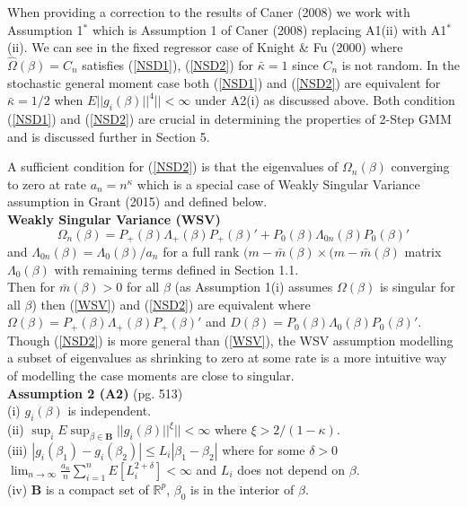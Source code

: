 \documentclass[11pt, fleqn]{article}
\begin{document}
When providing a correction to the results of Caner (2008) we work with Assumption 1$^*$ which is Assumption 1 of Caner (2008) replacing A1(ii) with  A1$^*$(ii). We can see in the fixed regressor case  of Knight \& Fu (2000)  where  $\hat{\Omega}(\beta)=C_n$ satisfies (\ref{NSD1}), (\ref{NSD2}) for $\bar{\kappa}=1$ since $C_n$ is not random. In the stochastic general moment case both (\ref{NSD1})  and (\ref{NSD2}) are equivalent for $\bar{\kappa}=1/2$ when $E|\!|g_i(\beta)|\!|^4|\!|<\infty$ under A2(i) as discussed above. Both condition (\ref{NSD1}) and (\ref{NSD2}) are crucial in determining the properties of 2-Step GMM and is discussed further in Section 5.


A sufficient condition for (\ref{NSD2}) is that the eigenvalues of $\Omega_n(\beta)$ converging to zero at rate $a_n=n^{\kappa}$ which is a special case of  Weakly Singular Variance assumption in Grant (2015) and defined below.\\

 \textbf{Weakly Singular Variance (WSV)}\begin{equation}\label{WSV} \Omega_n(\beta)=P_+(\beta)\Lambda_+(\beta)P_+(\beta)'+P_0(\beta)\Lambda_{0n}(\beta)P_0(\beta)'\end{equation}
   and $\Lambda_{0n}(\beta)=\Lambda_0(\beta)/a_n$   for a full rank  $(m-\bar{m}(\beta)\times (m-\bar{m}(\beta)$ matrix $\Lambda_0(\beta)$
with remaining terms defined in Section 1.1.\\
Then for $\bar{m}(\beta)>0$ for all $\beta$ (as Assumption 1(i) assumes $\Omega(\beta)$ is singular for all $\beta$) then  (\ref{WSV}) and (\ref{NSD2}) are equivalent where $\Omega(\beta)=P_+(\beta)\Lambda_+(\beta)P_+(\beta)'$ and $D(\beta)=P_0(\beta)\Lambda_{0}(\beta)P_0(\beta)'$. Though (\ref{NSD2}) is more general than (\ref{WSV}), the WSV  assumption modelling a subset of eigenvalues as shrinking to zero at some rate is a more intuitive way of modelling the case moments are close to singular.\\





\textbf{Assumption 2 (A2)} (pg. 513)\\
(i) $g_i(\beta)$ is independent.\\
(ii) $\sup_i E\sup_{\beta \in \mathbf{B}} |\!| g_i(\beta)|\!|^\xi|\!|<\infty$ where $\xi>2/(1-\kappa).$\\
(iii) $|g_i(\beta_1)-g_i(\beta_2)|\leq L_i |\beta_1-\beta_2|$ where for some $\delta>0$  $\lim_{n\rightarrow \infty}\frac{a_n}{n}\sum_{i=1}^n E[L_i^{2+\delta}]<\infty$ and $L_i$ does not depend on $\beta$.\\
(iv) $\mathbf{B}$ is a compact set of $\mathbb{R}^p$, $\beta_0$ is in the interior of $\beta$.\\
\end{document}
